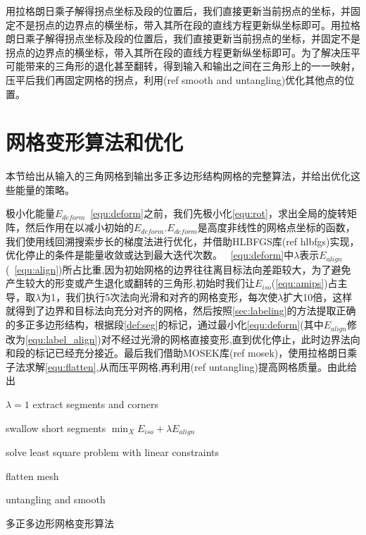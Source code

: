 用拉格朗日乘子解得拐点坐标及段的位置后，我们直接更新当前拐点的坐标，并固定不是拐点的边界点的横坐标，带入其所在段的直线方程更新纵坐标即可。用拉格朗日乘子解得拐点坐标及段的位置后，我们直接更新当前拐点的坐标，并固定不是拐点的边界点的横坐标，带入其所在段的直线方程更新纵坐标即可。为了解决压平可能带来的三角形的退化甚至翻转，得到输入和输出之间在三角形上的一一映射，压平后我们再固定网格的拐点，利用(ref smooth and untangling)优化其他点的位置。

\section{网格变形算法和优化}
本节给出从输入的三角网格到输出多正多边形结构网格的完整算法，并给出优化这些能量的策略。

极小化能量$E_{deform}$~\ref{equ:deform}之前，我们先极小化\ref{equ:rot}，求出全局的旋转矩阵，然后作用在以减小初始的$E_{deform}$.$E_{deform}$是高度非线性的网格点坐标的函数，我们使用线回溯搜索步长的梯度法进行优化，并借助HLBFGS库(ref hlbfgs)实现，优化停止的条件是能量收敛或达到最大迭代次数。
~\ref{equ:deform}中$\lambda$表示$E_{align}$(~\ref{equ:align})所占比重,因为初始网格的边界往往离目标法向差距较大，为了避免产生较大的形变或产生退化或翻转的三角形,初始时我们让$E_{iso}$(\ref{equ:amips})占主导，取$\lambda$为1，我们执行5次法向光滑和对齐的网格变形，每次使$\lambda$扩大10倍，这样就得到了边界和目标法向充分对齐的网格，然后按照\ref{sec:labeling}的方法提取正确的多正多边形结构，根据段\ref{def:seg}的标记，通过最小化\ref{equ:deform}(其中$E_{align}$修改为\ref{equ:label_align})对不经过光滑的网格直接变形,直到优化停止，此时边界法向和段的标记已经充分接近。最后我们借助MOSEK库(ref mosek)，使用拉格朗日乘子法求解\ref{equ:flatten},从而压平网格,再利用(ref untangling)提高网格质量。由此给出
\IncMargin{1em}
\begin{algorithm}
	$\lambda=1$\;
	extract segments and corners\;
	
	swallow short segments\;
	$\min_X E_{iso}+\lambda E_{align}$\;
	
	solve least square problem with linear constraints\;
	
	flatten mesh\;
	
	untangling and smooth\;
	
\caption{多正多边形网格变形算法} \label{algo_polymesh deform}

\end{algorithm}
